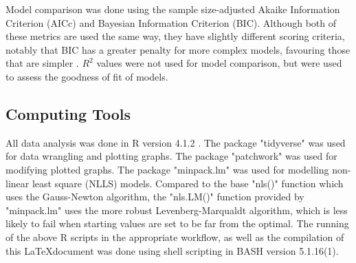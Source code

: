 \documentclass[11pt, letterpaper]{article}
\begin{document}
\noindent Model comparison was done using the sample size-adjusted Akaike Information Criterion (AICc) and Bayesian Information Criterion (BIC). Although both of these metrics are used the same way, they have slightly different scoring criteria, notably that BIC has a greater penalty for more complex models, favouring those that are simpler \citep{burnham&Anderson_2004}. $R^2$ values were not used for model comparison, but were used to assess the goodness of fit of models.

\subsection{Computing Tools}
All data analysis was done in R version 4.1.2 \citep{R}. The package "tidyverse" \citep{tidyverse} was used for data wrangling and plotting graphs. The package "patchwork" \citep{patchwork} was used for modifying plotted graphs. The package "minpack.lm" \citep{minpack.lm} was used for modelling non-linear least square (NLLS) models. Compared to the base "nls()" function which uses the Gauss-Newton algorithm, the "nls.LM()" function provided by "minpack.lm" uses the more robust Levenberg-Marqualdt algorithm, which is less likely to fail when starting values are set to be far from the optimal. 
The running of the above R scripts in the appropriate workflow, as well as the compilation of this \LaTeX \space document was done using shell scripting in BASH version 5.1.16(1).
\end{document}
